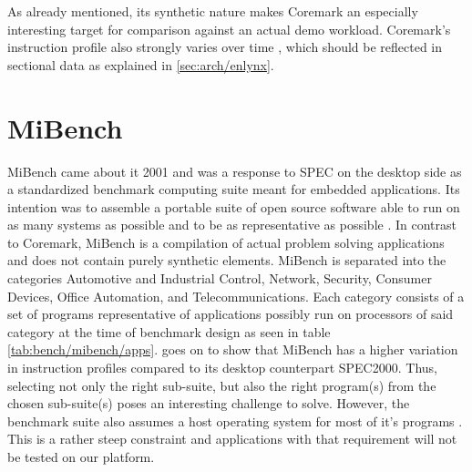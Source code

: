 \documentclass[../bachelor_paper.tex]{subfiles}
\begin{document}
As already mentioned, its synthetic nature makes Coremark an especially interesting target for comparison against an actual demo workload. Coremark's instruction profile also strongly varies over time \cite{gal-onExploringCoremarkBenchmark2012}, which should be reflected in sectional data as explained in \ref{sec:arch/enlynx}.

\section{MiBench}
    \label{sec:bench:mibench}
MiBench came about it 2001 and was a response to \acs{SPEC} on the desktop side as a standardized benchmark computing suite meant for embedded applications. Its intention was to assemble a portable suite of open source software able to run on as many systems as possible and to be as representative as possible \cite{guthausMiBenchFreeCommercially2001}. In contrast to Coremark, MiBench is a compilation of actual problem solving applications and does not contain purely synthetic elements. MiBench is separated into the categories Automotive and
Industrial Control, Network, Security, Consumer Devices, Office Automation, and Telecommunications. Each category consists of a set of programs representative of applications possibly run on processors of said category at the time of benchmark design as seen in table \ref{tab:bench/mibench/apps}. \cite{guthausMiBenchFreeCommercially2001} goes on to show that MiBench has a higher variation in instruction profiles compared to its desktop counterpart \acs{SPEC}2000. Thus, selecting not only the right sub-suite, but also the right program(s) from the chosen sub-suite(s) poses an interesting challenge to solve. However, the benchmark suite also assumes a host operating system for most of it's programs \cite{pallisterBEEBSOpenBenchmarks2013}. This is a rather steep constraint and applications with that requirement will not be tested on our platform. 
\end{document}

